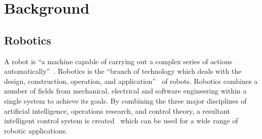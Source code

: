 
\chapter{Background}\label{litreview}


\section{Robotics}\label{litreview/robotics}
A robot is ``a machine capable of carrying out a complex series of actions 
automatically''~\cite{robotdef}. 
Robotics is the ``branch of technology which deals with the design, construction, 
operation, and application''~\cite{roboticsdef} of robots. Robotics combines a number of fields from mechanical, 
electrical and software engineering within a single system to achieve its goals. By 
combining the three major disciplines of artificial intelligence, operations 
research, and control theory, a resultant intelligent control system is created~
\cite{saridis1983intelligent} which can be 
used for a wide range of robotic applications.   

